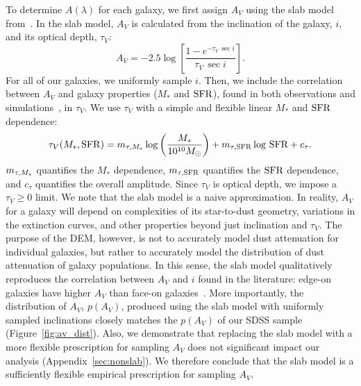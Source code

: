 To determine $A(\lambda)$ for each galaxy, we first assign $A_V$ using the slab
model from~\cite{somerville1999, somerville2012}. In the slab model, $A_V$ is
calculated from the inclination of the galaxy, $i$, and its optical depth, $\tau_V$: 
\begin{equation} \label{eq:slab}
    A_V = -2.5 \log \left[ \frac{1 - e^{-\tau_V\,\sec i}}{\tau_V\,\sec i} \right].
\end{equation}
For all of our galaxies, we uniformly sample $i$. Then, we include the
correlation between $A_V$ and galaxy properties ($M_*$ and ${\rm SFR}$), found
in both observations and simulations~\citep[\eg][]{narayanan2018, salim2020},
in $\tau_V$. We use $\tau_V$ with a simple and flexible linear $M_*$ and ${\rm SFR}$ 
dependence:
\begin{equation} \label{eq:tauv}
    \tau_V(M_*, {\rm SFR}) = m_{\tau,M_*} \log \left(\frac{M_*}{10^{10} M_\odot}\right) + m_{\tau,{\rm SFR}} \log\,{\rm SFR} + c_\tau.
\end{equation}
$m_{\tau,M_*}$ quantifies the $M_*$ dependence, $m_{\tau,{\rm SFR}}$ quantifies the ${\rm SFR}$
dependence, and $c_\tau$ quantifies the overall amplitude. Since $\tau_V$ is
optical depth, we impose a $\tau_V \ge 0$ limit. We note that the slab model 
is a naive approximation. In reality, $A_V$ for a galaxy will depend on complexities 
of its star-to-dust geometry, variations in the extinction curves, and other
properties beyond just inclination and $\tau_V$. The purpose of the DEM,
however, is not to accurately model dust attenuation for individual galaxies,
but rather to accurately model the distribution of dust attenuation of galaxy
populations. In this sense, the slab model qualitatively reproduces the
correlation between $A_V$ and $i$ found in the literature: edge-on galaxies
have higher $A_V$ than face-on galaxies~\citep[\eg][]{salim2020}. More
importantly, the distribution of $A_V$, $p(A_V)$, produced using the slab model with
uniformly sampled inclinations closely matches the $p(A_V)$ of our SDSS sample
(Figure~\ref{fig:av_dist}). Also, we demonstrate that replacing the slab model
with a more flexible prescription for sampling $A_V$ does not significant
impact our analysis (Appendix~\ref{sec:nonslab}). We therefore conclude that
the slab model is a sufficiently flexible empirical prescription for sampling
$A_V$. 

